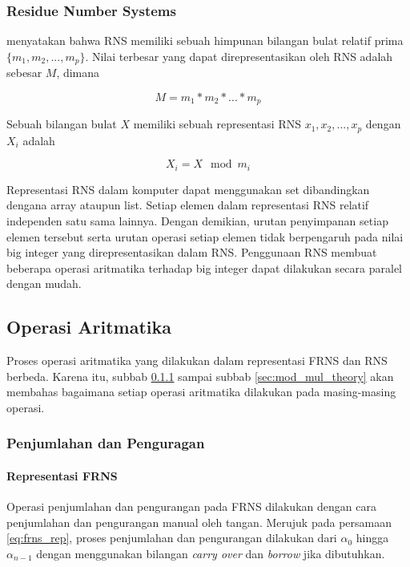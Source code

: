 \subsubsection{Residue Number Systems} \label{sec:rns}
\citet{rns_survey} menyatakan bahwa RNS memiliki sebuah himpunan bilangan bulat relatif prima $\{m_1,m_2,...,m_p\}$. Nilai terbesar yang dapat direpresentasikan oleh RNS adalah sebesar $M$, dimana

\begin{equation}
  M = m_1 * m_2 * ... * m_p
\end{equation}

Sebuah bilangan bulat $X$ memiliki sebuah representasi RNS ${x_1,x_2,...,x_p}$ dengan $X_i$ adalah

\begin{equation}
  X_i = X \mod m_i
\end{equation}


Representasi RNS dalam komputer dapat menggunakan set dibandingkan dengana array ataupun list. Setiap elemen dalam representasi RNS relatif independen satu sama lainnya. Dengan demikian, urutan penyimpanan setiap elemen tersebut serta urutan operasi setiap elemen tidak berpengaruh pada nilai big integer yang direpresentasikan dalam RNS. Penggunaan RNS membuat beberapa operasi aritmatika terhadap big integer dapat dilakukan secara paralel dengan mudah.

\subsection{Operasi Aritmatika}
Proses operasi aritmatika yang dilakukan dalam representasi FRNS dan RNS berbeda. Karena itu, subbab \ref{sec:add_sub_theory} sampai subbab \ref{sec:mod_mul_theory} akan membahas bagaimana setiap operasi aritmatika dilakukan pada masing-masing operasi.

\subsubsection{Penjumlahan dan Penguragan} \label{sec:add_sub_theory}
\paragraph{Representasi FRNS}

Operasi penjumlahan dan pengurangan pada FRNS dilakukan dengan cara penjumlahan dan pengurangan manual oleh tangan. Merujuk pada persamaan \ref{eq:frns_rep}, proses penjumlahan dan pengurangan dilakukan dari $\alpha_0$ hingga $\alpha_{n-1}$ dengan menggunakan bilangan \textit{carry over} dan \textit{borrow} jika dibutuhkan.

